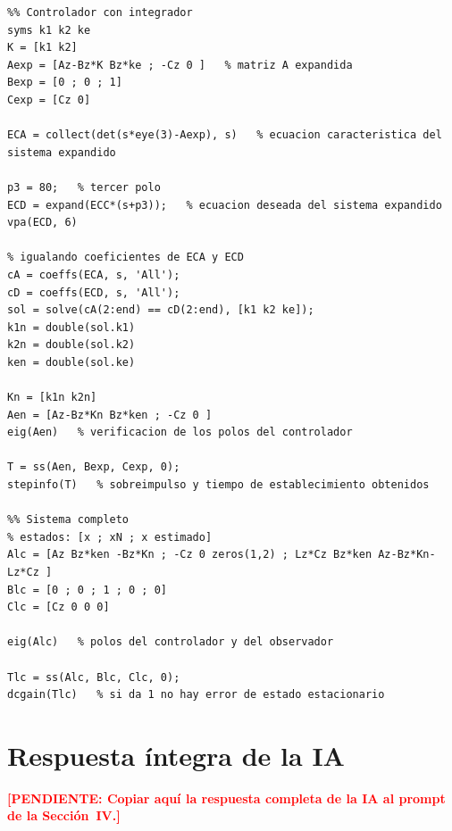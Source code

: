 \documentclass[conference]{IEEEtran}
\newcommand{\pendiente}[1]{\textcolor{red}{\textbf{[PENDIENTE: #1]}}}
\begin{document}
\begin{lstlisting}
%% Controlador con integrador
syms k1 k2 ke
K = [k1 k2]
Aexp = [Az-Bz*K Bz*ke ; -Cz 0 ]   % matriz A expandida
Bexp = [0 ; 0 ; 1]
Cexp = [Cz 0]

ECA = collect(det(s*eye(3)-Aexp), s)   % ecuacion caracteristica del sistema expandido

p3 = 80;   % tercer polo
ECD = expand(ECC*(s+p3));   % ecuacion deseada del sistema expandido
vpa(ECD, 6)

% igualando coeficientes de ECA y ECD
cA = coeffs(ECA, s, 'All');
cD = coeffs(ECD, s, 'All');
sol = solve(cA(2:end) == cD(2:end), [k1 k2 ke]);
k1n = double(sol.k1)
k2n = double(sol.k2)
ken = double(sol.ke)

Kn = [k1n k2n]
Aen = [Az-Bz*Kn Bz*ken ; -Cz 0 ]
eig(Aen)   % verificacion de los polos del controlador

T = ss(Aen, Bexp, Cexp, 0);
stepinfo(T)   % sobreimpulso y tiempo de establecimiento obtenidos

%% Sistema completo
% estados: [x ; xN ; x estimado]
Alc = [Az Bz*ken -Bz*Kn ; -Cz 0 zeros(1,2) ; Lz*Cz Bz*ken Az-Bz*Kn-Lz*Cz ]
Blc = [0 ; 0 ; 1 ; 0 ; 0]
Clc = [Cz 0 0 0]

eig(Alc)   % polos del controlador y del observador

Tlc = ss(Alc, Blc, Clc, 0);
dcgain(Tlc)   % si da 1 no hay error de estado estacionario
\end{lstlisting}

\section{Respuesta íntegra de la IA}
\label{ap:ia}
\pendiente{Copiar aquí la respuesta completa de la IA al prompt de la Sección~IV.}
\end{document}
